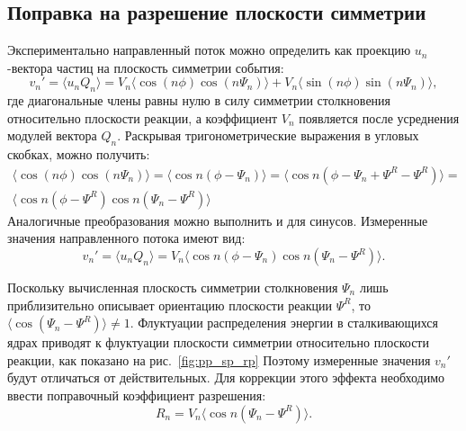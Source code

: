 \subsection{Поправка на разрешение плоскости симметрии}

Экспериментально направленный поток можно определить как проекцию $u_n$-вектора частиц на плоскость симметрии события:
%
\begin{equation}
    v_n' =  \langle u_n Q_n \rangle = 
    V_n \langle \cos (n\phi) \cos (n\Psi_n) \rangle + V_n \langle \sin(n\phi) \sin(n\Psi_n) \rangle,
\end{equation}
%
где диагональные члены равны нулю в силу симметрии столкновения относительно плоскости реакции, а коэффициент $V_n$ появляется после усреднения модулей вектора $Q_n$.
Раскрывая тригонометрические выражения в угловых скобках, можно получить:
%
\begin{equation}
\begin{align}
    \langle \cos (n\phi) \cos (n\Psi_n) \rangle = \langle \cos n ( \phi - \Psi_n ) \rangle
    = \langle \cos n ( \phi - \Psi_n + \Psi^R - \Psi^R ) \rangle = \\
    \langle \cos n ( \phi - \Psi^R ) \cos n (\Psi_n - \Psi^R ) \rangle
\end{align}
\end{equation}
%
Аналогичные преобразования можно выполнить и для синусов. 
Измеренные значения направленного потока имеют вид:
%
\begin{equation}
    v_n' =  \langle u_n Q_n \rangle = 
    V_n \langle \cos n ( \phi - \Psi_n ) \cos n (\Psi_n - \Psi^R) \rangle.
    \label{eq:uq_transformation}
\end{equation}
%

Поскольку вычисленная плоскость симметрии столкновения $\Psi_n$ лишь приблизительно описывает ориентацию плоскости реакции $\Psi^R$, то $ \langle \cos(\Psi_n - \Psi^R) \rangle \ne 1 $.
Флуктуации распределения энергии в сталкивающихся ядрах приводят к флуктуации плоскости симметрии относительно плоскости реакции, как показано на рис.~\ref{fig:pp_sp_rp}
Поэтому измеренные значения $v_n'$ будут отличаться от действительных.
Для коррекции этого эффекта необходимо ввести поправочный коэффициент разрешения:
%
\begin{equation}
    R_n = V_n \langle \cos n (\Psi_n - \Psi^R) \rangle.
\end{equation}
%

